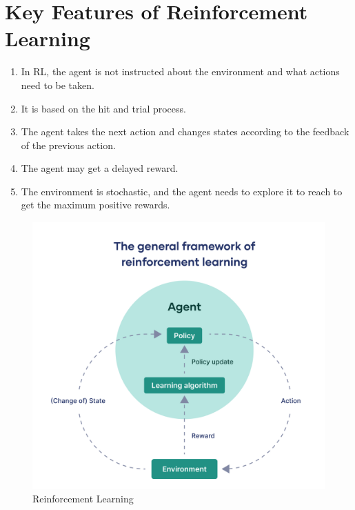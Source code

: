 \documentclass[12pt,a4paper]{report}
\begin{document}
\section*{Key Features of Reinforcement Learning}
\begin{enumerate}
\item In RL, the agent is not instructed about the environment and what actions need to be taken.
\item It is based on the hit and trial process.
\item The agent takes the next action and changes states according to the feedback of the previous action.
\item The agent may get a delayed reward.
\item The environment is stochastic, and the agent needs to explore it to reach to get the maximum positive rewards.
\end{enumerate}
\begin{figure}[htbp]
    \centering
    \includegraphics[width=\textwidth]{the-general-framework-of-reinforcement-learning.png}
    \caption{Reinforcement Learning}
    \label{fig:Reinforcement Learning}
\end{figure}
\end{document}
